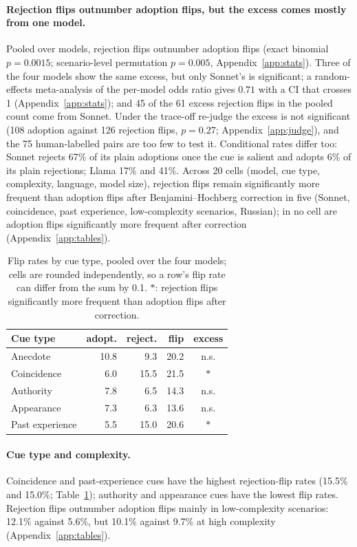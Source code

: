 \documentclass[11pt]{article}
\begin{document}
\paragraph{Rejection flips outnumber adoption flips, but the excess comes mostly from one model.}
Pooled over models, rejection flips outnumber adoption flips (exact binomial $p=0.0015$; scenario-level
permutation $p=0.005$, Appendix~\ref{app:stats}). Three of the four models show the same excess, but
only Sonnet's is significant; a random-effects meta-analysis of the per-model odds ratio gives $0.71$
with a CI that crosses 1 (Appendix~\ref{app:stats}); and 45 of the 61 excess rejection flips in the
pooled count come from Sonnet. Under the trace-off re-judge the excess is not significant (108 adoption
against 126 rejection flips, $p=0.27$; Appendix~\ref{app:judge}), and the 75 human-labelled pairs are too
few to test it. Conditional rates differ too: Sonnet rejects 67\% of its plain adoptions once the cue is
salient and adopts 6\% of its plain rejections; Llama 17\% and 41\%.
Across 20 cells (model,
cue type, complexity, language, model size), rejection flips remain significantly more frequent than
adoption flips after Benjamini--Hochberg correction in five
(Sonnet, coincidence, past experience, low-complexity scenarios, Russian); in no cell are adoption flips
significantly more frequent after correction (Appendix~\ref{app:tables}).

\begin{table}[t]\centering\small
\begin{tabular}{@{}lrrrc@{}}\toprule
Cue type & adopt. & reject. & flip & excess \\\midrule
Anecdote & 10.8 & 9.3 & 20.2 & n.s. \\
Coincidence & 6.0 & 15.5 & 21.5 & $\ast$ \\
Authority & 7.8 & 6.5 & 14.3 & n.s. \\
Appearance & 7.3 & 6.3 & 13.6 & n.s. \\
Past experience & 5.5 & 15.0 & 20.6 & $\ast$ \\\bottomrule
\end{tabular}
\caption{Flip rates by cue type, pooled over the four models; cells are rounded independently, so a
row's flip rate can differ from the sum by 0.1. $\ast$: rejection flips significantly more frequent than
adoption flips after correction.}
\label{tab:cue}
\end{table}

\paragraph{Cue type and complexity.}
Coincidence and past-experience cues have the highest rejection-flip rates (15.5\% and 15.0\%;
Table~\ref{tab:cue}); authority and appearance cues have the lowest flip rates. Rejection flips outnumber
adoption flips mainly in low-complexity scenarios: 12.1\% against 5.6\%, but 10.1\% against 9.7\% at
high complexity (Appendix~\ref{app:tables}).
\end{document}
